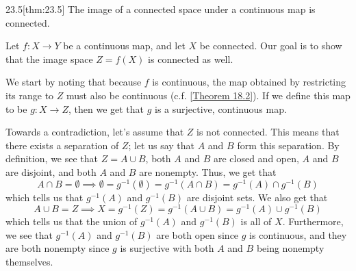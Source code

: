 \begin{thmBox}{23.5}[thm:23.5]
    The image of a connected space under a continuous map is connected.

    \baseRule

    \begin{proofBox}
        Let \( f: X \rightarrow Y \) be a continuous map, and let \( X \) be 
        connected.
        Our goal is to show that the image space \( Z = f ( X ) \) is connected
        as well.

        \baseSkip 

        We start by noting that because \( f \) is continuous, the map obtained
        by restricting its range to \( Z \) must also be continuous (c.f. 
        [\hyperlink{thm:18.2}{Theorem 18.2}]).
        If we define this map to be \( g: X \rightarrow Z \), then we get that
        \( g \) is a surjective, continuous map.

        \baseSkip 
        
        Towards a contradiction, let's assume that \( Z \) is not connected.
        This means that there exists a separation of \( Z \); let us say that 
        \( A \) and \( B \) form this separation.
        By definition, we see that \( Z = A \cup B \), both \( A \) and \( B \)
        are closed and open, \( A \) and \( B \) are disjoint, and both \( A \) 
        and \( B \) are nonempty.
        Thus, we get that 
        \begin{equation*}
            A \cap B = \emptyset 
            \implies 
            \emptyset
            =
            g^{ -1 } ( \emptyset )
            =
            g^{ -1 } ( A \cap B )
            =
            g^{ -1 } ( A ) \cap g^{ -1 } ( B )
        \end{equation*}
        which tells us that \( g^{ -1 } ( A ) \) and \( g^{ -1 } ( B ) \) are
        disjoint sets.
        We also get that 
        \begin{equation*}
            A \cup B
            =
            Z
            \implies 
            X
            =
            g^{ -1 } ( Z )
            =
            g^{ -1 } ( A \cup B )
            =
            g^{ -1 } ( A ) \cup g^{ -1 } ( B )
        \end{equation*}
        which tells us that the union of \( g^{ -1 } ( A ) \) and 
        \( g^{ -1 } ( B ) \) is all of \( X \).
        Furthermore, we see that \( g^{ -1 } ( A ) \) and \( g^{ -1 } ( B ) \)
        are both open since \( g \) is continuous, and they are both nonempty
        since \( g \) is surjective with both \( A \) and \( B \) being 
        nonempty themselves.


\end{proofBox}
\end{thmBox}
